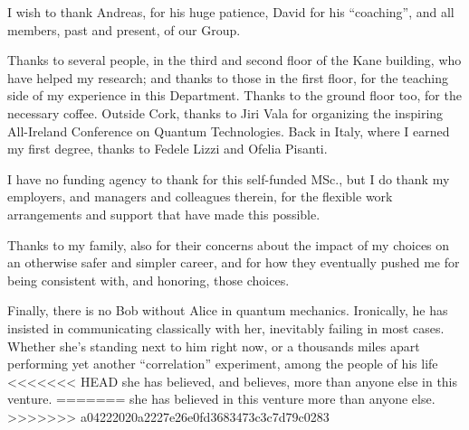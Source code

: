 I wish to thank Andreas, for his huge patience, David for
his ``coaching'',
and all members, past and present, of our Group.

Thanks to several people, in the third and second floor of the Kane building,
who have helped my research; and thanks to those in the first floor,
for the teaching side of my experience in this Department.
Thanks to the ground floor too, for the necessary coffee.
Outside Cork, thanks to Jiri Vala
for organizing the inspiring All-Ireland Conference on Quantum Technologies.
Back in Italy, where I earned my first degree, thanks to Fedele Lizzi and Ofelia Pisanti.

I have no funding agency to thank for this self-funded MSc.,
but I do thank my employers, and managers and colleagues therein,
for the flexible work arrangements and support that have made this possible.

Thanks to my family, also for their concerns about the impact of my choices on an otherwise safer and simpler career,
and for how they eventually pushed me for being consistent with, and honoring, those choices.

Finally, there is no Bob without Alice in quantum mechanics.
Ironically, he has insisted in communicating classically with her,
inevitably failing in most cases.
Whether she's standing next to him right now,
or a thousands miles apart performing yet another ``correlation'' experiment,
among the people of his life
<<<<<<< HEAD
she has believed, and believes, more than anyone else in this venture.
=======
she has believed in this venture more than anyone else.
>>>>>>> a04222020a2227e26e0fd3683473c3c7d79c0283
